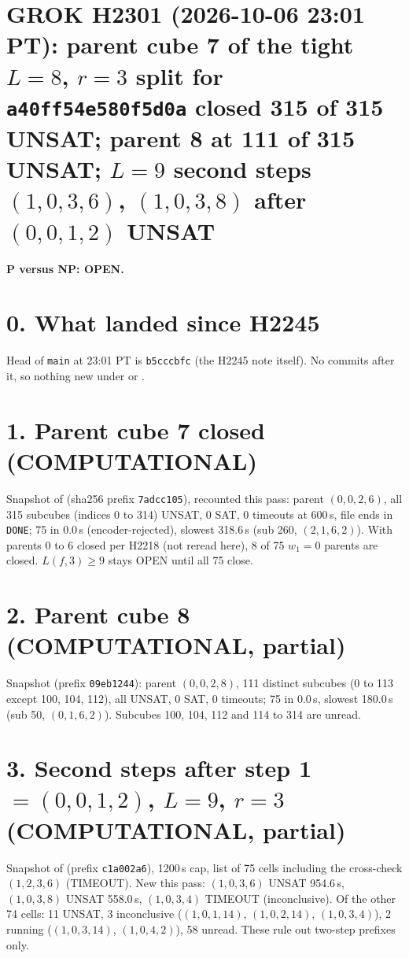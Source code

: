 \documentclass[11pt]{article}
\begin{document}
\sloppy
\section*{GROK H2301 (2026-10-06 23:01 PT): parent cube 7 of the tight $L=8$, $r=3$ split for \texttt{a40ff54e580f5d0a} closed 315 of 315 UNSAT; parent 8 at 111 of 315 UNSAT; $L=9$ second steps $(1,0,3,6)$, $(1,0,3,8)$ after $(0,0,1,2)$ UNSAT}
\textbf{P versus NP: OPEN.}

\section*{0. What landed since H2245}
Head of \texttt{main} at 23:01 PT is \texttt{b5cccbfc} (the H2245 note itself). No commits after it, so nothing new under  or .

\section*{1. Parent cube 7 closed (COMPUTATIONAL)}
Snapshot  of  (sha256 prefix \texttt{7adcc105}), recounted this pass: parent $(0,0,2,6)$, all 315 subcubes (indices 0 to 314) UNSAT, 0 SAT, 0 timeouts at 600\,s, file ends in \texttt{DONE}; 75 in 0.0\,s (encoder-rejected), slowest 318.6\,s (sub 260, $(2,1,6,2)$). With parents 0 to 6 closed per H2218 (not reread here), 8 of 75 $w_1=0$ parents are closed. $L(f,3)\ge 9$ stays OPEN until all 75 close.

\section*{2. Parent cube 8 (COMPUTATIONAL, partial)}
Snapshot  (prefix \texttt{09eb1244}): parent $(0,0,2,8)$, 111 distinct subcubes (0 to 113 except 100, 104, 112), all UNSAT, 0 SAT, 0 timeouts; 75 in 0.0\,s, slowest 180.0\,s (sub 50, $(0,1,6,2)$). Subcubes 100, 104, 112 and 114 to 314 are unread.

\section*{3. Second steps after step 1 $=(0,0,1,2)$, $L=9$, $r=3$ (COMPUTATIONAL, partial)}
Snapshot  of  (prefix \texttt{c1a002a6}), 1200\,s cap, list of 75 cells including the cross-check $(1,2,3,6)$ (TIMEOUT). New this pass: $(1,0,3,6)$ UNSAT 954.6\,s, $(1,0,3,8)$ UNSAT 558.0\,s, $(1,0,3,4)$ TIMEOUT (inconclusive). Of the other 74 cells: 11 UNSAT, 3 inconclusive ($(1,0,1,14)$, $(1,0,2,14)$, $(1,0,3,4)$), 2 running ($(1,0,3,14)$, $(1,0,4,2)$), 58 unread. These rule out two-step prefixes only.
\end{document}
